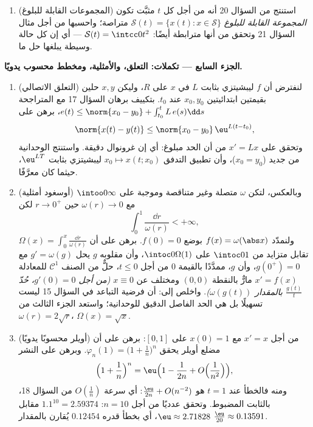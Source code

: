 \begin{problem}[{مسألة نهاية الأسبوع --- وجود حلول المعادلة
$x' = f(t, x)$ دون شرط ليبشيتز}]
\begin{enumerate}[resume]
        $\intcc0\infty$ (، أي بلصق
        $c = \infty$ بوصفها نهاية) إلى $\mathcal C([0,1])$، واخلص إلى أن
        $\mathcal S$ متراصة ومترابطة فعلًا --- أي قمع على شكل
        قطعة.
  \item (المجموعات القابلة للبلوغ) استنتج من السؤال 20 أنه من
        أجل كل $t$ مثبَّت تكون \emph{المجموعة القابلة للبلوغ}
        $\mathcal S(t) =
        \{x(t) : x \in \mathcal S\}$ متراصة؛ واحسبها من أجل مثال السؤال 21 وتحقق من
        أنها مترابطة أيضًا: $\mathcal S(t) = \intcc0{t^2}$ --- أي إن كل حالة وسيطة
        يبلغها حل ما.
\end{enumerate}

\medskip
\noindent\textbf{الجزء السابع --- تكملات: التعلق، والأمثلية،
ومخطط محسوب يدويًا.}
\begin{enumerate}[resume]
  \item (التعلق الاتصالي) لنفترض أن $f$ ليبشيتزي بثابت $L$ في
        $x$ على $R$، وليكن $x, y$ حلين بقيمتين ابتدائيتين
        $x_0, y_0$ عند $t_0$. بتكييف برهان السؤال 17 مع
        المتراجحة $e(t) \leq \norm{x_0
        - y_0} + \int_{t_0}^tL\,e(s)\dd s$، برهن على
        \[
        \norm{x(t) - y(t)} \leq \norm{x_0 - y_0}\,
        \eu^{L(t - t_0)},
        \]
        وتحقق على $x' = Lx$ من أن الحد مبلوغ: أي إن غرونوال
        دقيقة. واستنتج الوحدانية من جديد ($x_0 =
        y_0$)، وأن تطبيق
        التدفق $x_0 \mapsto x(t; x_0)$ ليبشيتزي بثابت $\eu^{LT}$، حيثما كان
        معرَّفًا.
  \item (أوسغود أمثلية) وبالعكس، لتكن $\omega$ متصلة وغير
        متناقصة وموجبة على $\intoo0\infty$ مع $\omega(r) \to 0$ حين
        $r \to 0^+$ لكن
        \[
        \int_0^1\frac{\dd r}{\omega(r)} < +\infty,
        \]
        ولنمدّد $f(x) = \omega(\abs x)$ بوضع $f(0) = 0$. برهن على أن $\Omega(x) = \int_0^x\frac{\dd r}{\omega(r)}$
        تقابل متزايد من $\intoc0{1}$ على $\intoc0{\Omega(1)}$، وأن مقلوبه
        $g$ يحل $g'
        = \omega(g)$ مع $g(0^+) = 0$، وأن $g$، ممدَّدًا
        بالقيمة $0$ من أجل $t \leq 0$، حلٌّ من الصنف
        $\mathcal C^1$ للمعادلة $x' = f(x)$ مارٌّ بالنقطة
        $(0, 0)$ ومختلف عن $x \equiv
        0$ \emph{(من أجل $g'(0) = 0$،
        حُدّ $\frac{g(t)}t$ بالمقدار $\omega(g(t))$)}. واخلص
        إلى: أن فرضية التباعد في السؤال 15 ليست تسهيلًا بل هي
        الحد الفاصل الدقيق للوحدانية؛ واستعد الجزء الثالث من
        $\omega(r) = 2\sqrt r$، $\Omega(x) = \sqrt x$.
  \item (أويلر محسوبًا يدويًا) من أجل $x' = x$ مع $x(0) = 1$
        على $[0, 1]$: برهن على أن مضلع أويلر يحقق $\varphi_n(1) = \bigl(1 + \frac1n\bigr)^n$.
        وبرهن على النشر
        \[
        \Bigl(1 + \frac1n\Bigr)^{n}
        = \eu\Bigl(1 - \frac1{2n} + O\Bigl(\frac1{n^2}\Bigr)
        \Bigr),
        \]
        ومنه فالخطأ عند $t = 1$ هو $\frac{\eu}{2n} +
        O(n^{-2})$: أي سرعة
        $O(\frac1n)$ من السؤال 18، بالثابت المضبوط. وتحقق
        عدديًا من أجل $n = 10$: $1.1^{10} = 2.59374$ مقابل $\eu \approx 2.71828$، أي بخطأ
        قدره $0.12454$ يُقارن بالمقدار $\frac{\eu}{20}
        \approx 0.13591$.
\end{enumerate}
\end{problem}
